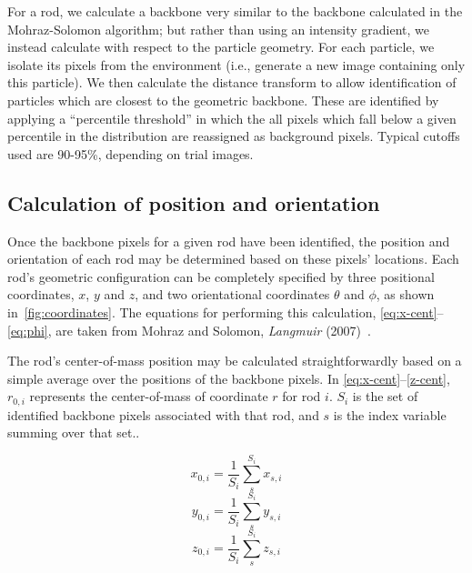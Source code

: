 For a rod, we calculate a backbone very similar to the backbone calculated in the Mohraz-Solomon algorithm; but rather 
than using an intensity gradient, we instead calculate with respect to the particle geometry. For each particle, we 
isolate its pixels from the environment (i.e., generate a new image containing only this particle). We then
calculate the distance transform to allow identification of particles which are closest to the 
geometric backbone.  These are identified by applying a ``percentile threshold'' in which the all pixels which
fall below a given percentile in the distribution are reassigned as background pixels. Typical cutoffs used
are 90-95\%, depending on trial images.

\subsection{Calculation of position and orientation}


Once the backbone pixels for a given rod have been identified, the position and orientation of each rod may
be determined based on these pixels' locations.  Each rod's geometric configuration can be
completely specified by three positional coordinates, $x$, $y$ and $z$, and two
orientational coordinates $\theta$ and $\phi$, as shown in~\ref{fig:coordinates}.
The equations for performing this calculation,
\ref{eq:x-cent}--\ref{eq:phi}, are taken from 
Mohraz and Solomon, \textit{Langmuir} (2007)~\cite{solomon-rods}.

The rod's center-of-mass position may be calculated
straightforwardly based on a simple average over the positions of the backbone pixels.  In 
\ref{eq:x-cent}--\ref{z-cent}, $r_{0,i}$ represents the center-of-mass of coordinate $r$ for 
rod $i$.  $S_i$ is the set of identified backbone pixels associated with that rod, and $s$ is the index
variable summing over that set..

\begin{equation}
\label{eq:x-cent}
x_{0,i} = \frac{1}{S_i} \sum_{s}^{S_i} x_{s,i}
\end{equation}
\begin{equation}
\label{eq:y-cent}
y_{0,i} = \frac{1}{S_i} \sum_{s}^{S_i} y_{s,i}
\end{equation}
\begin{equation}
\label{eq:z-cent}
z_{0,i} = \frac{1}{S_i} \sum_{s}^{S_i} z_{s,i} 
\end{equation}

